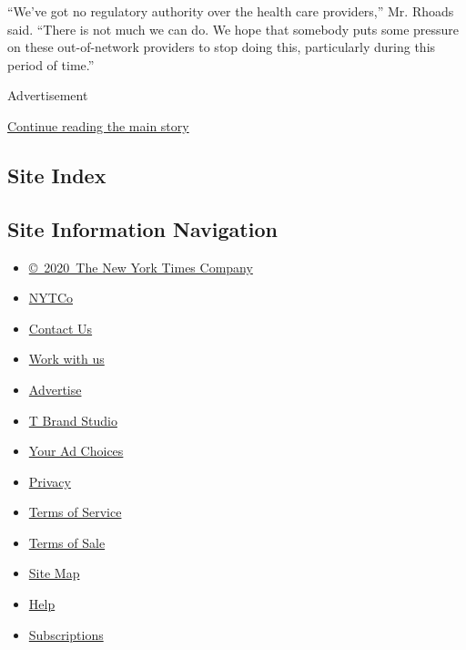 ``We've got no regulatory authority over the health care providers,''
Mr. Rhoads said. ``There is not much we can do. We hope that somebody
puts some pressure on these out-of-network providers to stop doing this,
particularly during this period of time.''

Advertisement

\protect\hyperlink{after-bottom}{Continue reading the main story}

\hypertarget{site-index}{%
\subsection{Site Index}\label{site-index}}

\hypertarget{site-information-navigation}{%
\subsection{Site Information
Navigation}\label{site-information-navigation}}

\begin{itemize}
\tightlist
\item
  \href{https://help.nytimes.com/hc/en-us/articles/115014792127-Copyright-notice}{©~2020~The
  New York Times Company}
\end{itemize}

\begin{itemize}
\tightlist
\item
  \href{https://www.nytco.com/}{NYTCo}
\item
  \href{https://help.nytimes.com/hc/en-us/articles/115015385887-Contact-Us}{Contact
  Us}
\item
  \href{https://www.nytco.com/careers/}{Work with us}
\item
  \href{https://nytmediakit.com/}{Advertise}
\item
  \href{http://www.tbrandstudio.com/}{T Brand Studio}
\item
  \href{https://www.nytimes.com/privacy/cookie-policy\#how-do-i-manage-trackers}{Your
  Ad Choices}
\item
  \href{https://www.nytimes.com/privacy}{Privacy}
\item
  \href{https://help.nytimes.com/hc/en-us/articles/115014893428-Terms-of-service}{Terms
  of Service}
\item
  \href{https://help.nytimes.com/hc/en-us/articles/115014893968-Terms-of-sale}{Terms
  of Sale}
\item
  \href{https://spiderbites.nytimes.com}{Site Map}
\item
  \href{https://help.nytimes.com/hc/en-us}{Help}
\item
  \href{https://www.nytimes.com/subscription?campaignId=37WXW}{Subscriptions}
\end{itemize}
